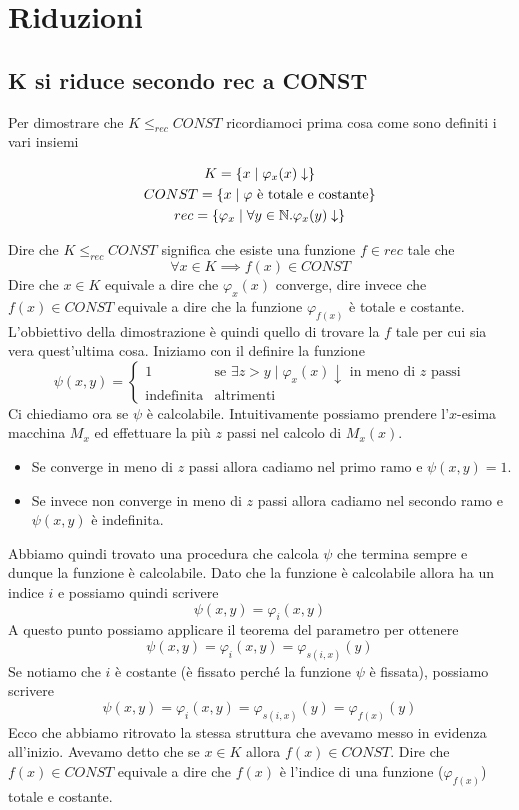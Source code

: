 \section{Riduzioni}

\subsection{K si riduce secondo rec a CONST}

Per dimostrare che $K \leq_{rec} CONST$ ricordiamoci prima cosa
come sono definiti i vari insiemi

\begin{gather*}
	K = \{ x \mid \varphi_x (x) \downarrow \} \\
	CONST = \{ x \mid \varphi \text{ è totale e costante} \} \\
	rec = \{ \varphi_x \mid \forall y \in \mathbb{N} . \varphi_x (y) \downarrow \}
\end{gather*}

Dire che $K \leq_{rec} CONST$ significa che esiste una funzione
$f \in rec$ tale che
\[ \forall x \in K \implies f(x) \in CONST \]
Dire che $x \in K$ equivale a dire che $\varphi_x (x)$ converge,
dire invece che $f(x) \in CONST$ equivale a dire che la funzione
$\varphi_{f(x)}$ è totale e costante. L'obbiettivo della
dimostrazione è quindi quello di trovare la $f$ tale per cui sia
vera quest'ultima cosa. Iniziamo con il definire la funzione
\[
	\psi (x, y) = \begin{cases}
		1                 & \text{se } \exists z > y \mid
		\varphi_x(x) \downarrow \text{ in meno di $z$ passi} \\
		\text{indefinita} & \text{altrimenti}
	\end{cases}
\]
Ci chiediamo ora se $\psi$ è calcolabile. Intuitivamente possiamo
prendere l'$x$-esima macchina $M_x$ ed effettuare la più $z$
passi nel calcolo di $M_x(x)$.
\begin{itemize}
	\item Se converge in meno di $z$ passi allora cadiamo nel
	      primo ramo e $\psi(x, y) = 1$.
	\item Se invece non converge in meno di $z$ passi allora
	      cadiamo nel secondo ramo e $\psi(x,y)$ è indefinita.
\end{itemize}
Abbiamo quindi trovato una procedura che calcola $\psi$ che
termina sempre e dunque la funzione è calcolabile. Dato che la
funzione è calcolabile allora ha un indice $i$ e possiamo quindi
scrivere
\[ \psi(x, y) = \varphi_i (x, y) \]
A questo punto possiamo applicare il teorema del parametro per
ottenere
\[ \psi(x, y) = \varphi_i (x, y) = \varphi_{s(i,x)} (y) \]
Se notiamo che $i$ è costante (è fissato perché la funzione
$\psi$ è fissata), possiamo scrivere
\[
	\psi(x, y) = \varphi_i (x, y) =
	\varphi_{s(i,x)} (y) = \varphi_{f(x)} (y)
\]
Ecco che abbiamo ritrovato la stessa struttura che avevamo messo
in evidenza all'inizio. Avevamo detto che se $x \in K$ allora
$f(x) \in CONST$. Dire che $f(x) \in CONST$ equivale a dire che
$f(x)$ è l'indice di una funzione ($\varphi_{f(x)}$) totale e
costante.

